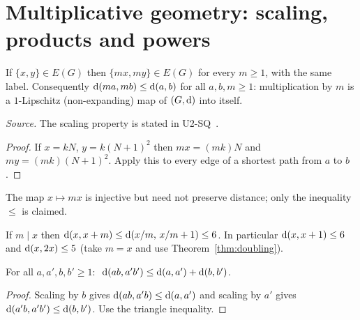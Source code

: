\section{Multiplicative geometry: scaling, products and powers}\label{sec:mult}
\begin{theorem}[Scaling]\label{thm:scaling}
If $\{x,y\}\in E(G)$ then $\{mx,my\}\in E(G)$ for every $m\ge1$, with the same label. Consequently $\operatorname{d}(ma,mb)\le\operatorname{d}(a,b)$ for all $a,b,m\ge1$: multiplication by $m$ is a $1$-Lipschitz (non-expanding) map of $(G,\operatorname{d})$ into itself.
\end{theorem}
\noindent\emph{Source.} The scaling property is stated in U2-SQ~\cite{u2sq}.
\begin{proof} If $x=kN$, $y=k(N+1)^2$ then $mx=(mk)N$ and $my=(mk)(N+1)^2$. Apply this to every edge of a shortest path from $a$ to $b$. \end{proof}
The map $x\mapsto mx$ is injective but need not preserve distance; only the inequality $\le$ is claimed.
\begin{corollary}\label{cor:divstep}
If $m\mid x$ then $\operatorname{d}(x,x+m)\le\operatorname{d}(x/m,\,x/m+1)\le6$. In particular $\operatorname{d}(x,x+1)\le6$ and $\operatorname{d}(x,2x)\le5$ (take $m=x$ and use Theorem~\ref{thm:doubling}).
\end{corollary}

\begin{theorem}\label{thm:product}
For all $a,a',b,b'\ge1$: $\ \dist(ab,a'b')\le\dist(a,a')+\dist(b,b')$.
\end{theorem}
\begin{proof} Scaling by $b$ gives $\operatorname{d}(ab,a'b)\le\operatorname{d}(a,a')$ and scaling by $a'$ gives $\operatorname{d}(a'b,a'b')\le\operatorname{d}(b,b')$. Use the triangle inequality. \end{proof}

